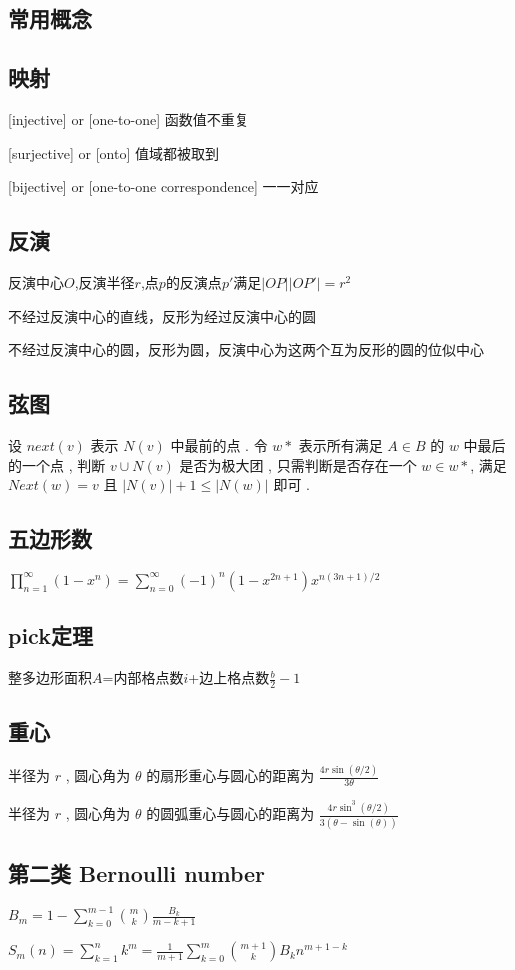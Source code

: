 \subsection{常用概念}
\subsection{映射}
[injective] or [one-to-one] 函数值不重复 \par {[}surjective] or [onto] 值域都被取到 \par {[}bijective] or [one-to-one correspondence] 一一对应
\subsection{反演}
反演中心$O$,反演半径$r$,点$p$的反演点$p'$满足$|OP||OP'|=r^2$\par
不经过反演中心的直线，反形为经过反演中心的圆\par
不经过反演中心的圆，反形为圆，反演中心为这两个互为反形的圆的位似中心\par
\subsection{弦图}
设 $next(v)$ 表示 $N(v)$ 中最前的点 . 
令 $w*$ 表示所有满足 $A \in B$ 的 $w$ 中最后的一个点 , 
判断 $v \cup N(v)$ 是否为极大团 , 
只需判断是否存在一个 $w \in w*$, 
满足 $Next(w)=v$ 且 $|N(v)| + 1 \leq |N(w)|$ 即可 . 
\subsection{五边形数}
$\prod_{n=1}^{\infty}{(1-x^{n})}=\sum_{n=0}^{\infty}{(-1)^{n}(1-x^{2n+1})x^{n(3n+1)/2}}$
\subsection{pick定理}
整多边形面积$A$=内部格点数$i$+边上格点数$\frac{b}{2}-1$\par
\subsection{重心}
半径为 $r$ , 圆心角为 $\theta$ 的扇形重心与圆心的距离为 $\frac{4r\sin(\theta/2)}{3\theta}$ \par
半径为 $r$ , 圆心角为 $\theta$ 的圆弧重心与圆心的距离为 $\frac{4r\sin^3(\theta/2)}{3(\theta-\sin(\theta))}$ \par
\subsection{第二类 Bernoulli number}
$B_m = 1 - \sum_{k=0}^{m-1}{\binom{m}{k}\frac{B_{k}}{m-k+1}}$\par
$S_m(n) = \sum_{k=1}^{n}{k^{m}} = \frac{1}{m+1}\sum_{k=0}^{m}{\binom{m+1}{k}B_{k}n^{m+1-k}}$\par
